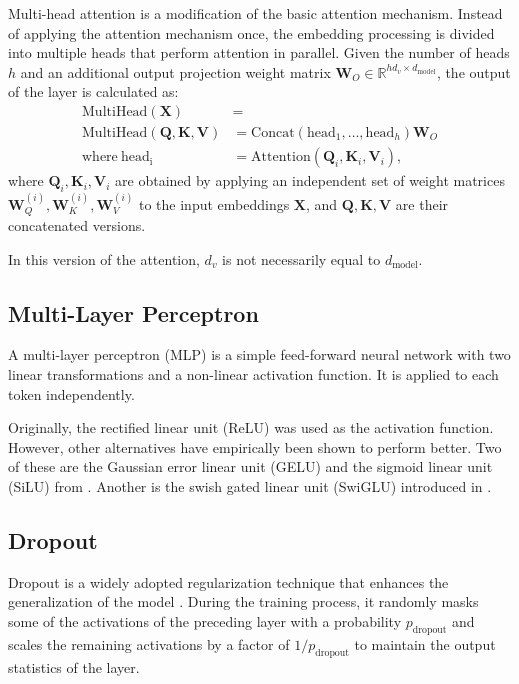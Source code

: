 Multi-head attention is a modification of the basic attention mechanism. Instead of applying the attention mechanism once, the embedding processing is divided into multiple heads that perform attention in parallel. Given the number of heads \(h\) and an additional output projection weight matrix \(\mathbf{W}_O \in \mathbb{R}^{hd_v \times d_{\mathrm{model}}}\), the output of the layer is calculated as:
\begin{align}
    \mathrm{MultiHead}(\mathbf{X}) &= \\ \mathrm{MultiHead}(\mathbf{Q}, \mathbf{K}, \mathbf{V}) &= \mathrm{Concat}(\mathrm{head}_1, \ldots, \mathrm{head}_h) \mathbf{W}_O \\
    \text{where}~\mathrm{head_i} &= \mathrm{Attention}(\mathbf{Q}_i, \mathbf{K}_i, \mathbf{V}_i),
\end{align}
where \(\mathbf{Q}_i, \mathbf{K}_i, \mathbf{V}_i\) are obtained by applying an independent set of weight matrices \(\mathbf{W}_Q^{(i)}, \mathbf{W}_K^{(i)}, \mathbf{W}_V^{(i)}\) to the input embeddings \(\mathbf{X}\), and \(\mathbf{Q}, \mathbf{K}, \mathbf{V}\) are their concatenated versions.

In this version of the attention, \(d_v\) is not necessarily equal to \(d_{\mathrm{model}}\).

\subsection{Multi-Layer Perceptron}

A multi-layer perceptron (MLP) is a simple feed-forward neural network with two linear transformations and a non-linear activation function. It is applied to each token independently.

Originally, the rectified linear unit (ReLU) was used as the activation function. However, other alternatives have empirically been shown to perform better. Two of these are the Gaussian error linear unit (GELU) and the sigmoid linear unit (SiLU) from \citet{hendrycks2023}. Another is the swish gated linear unit (SwiGLU) introduced in \citet{shazeer2020}.

\subsection{Dropout}

Dropout is a widely adopted regularization technique that enhances the generalization of the model \parencite{srivastava2014}. During the training process, it randomly masks some of the activations of the preceding layer with a probability \(p_{\mathrm{dropout}}\) and scales the remaining activations by a factor of \(1 / p_{\mathrm{dropout}}\) to maintain the output statistics of the layer.

